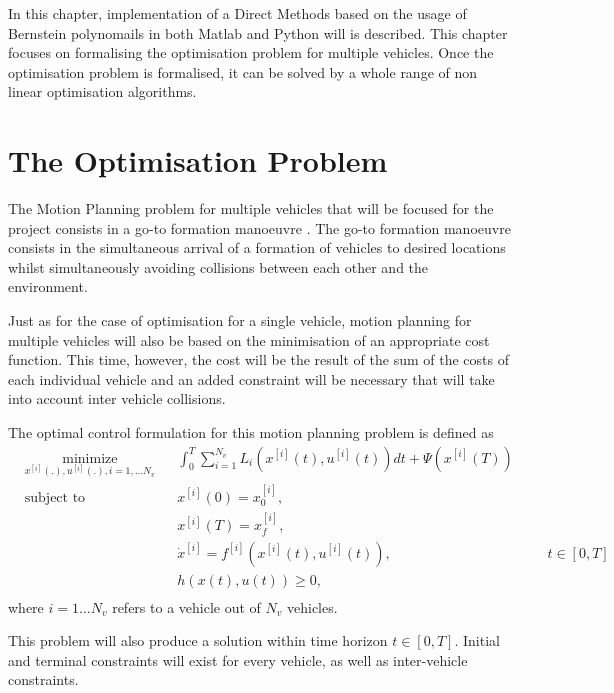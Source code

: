 \cleardoublepage
\label{chap:implementation}

\par In this chapter, implementation of a Direct Methods based on the usage of Bernstein polynomails in both Matlab and Python will is described. This chapter focuses on formalising the optimisation problem for multiple vehicles. Once the optimisation problem is formalised, it can be solved by a whole range of non linear optimisation algorithms.

\section{The Optimisation Problem}
\label{sec:theoptproblem}

\par The Motion Planning problem for multiple vehicles that will be focused for the project consists in a go-to formation manoeuvre \cite{sabetghadam2018cooperative}. The go-to formation manoeuvre consists in the simultaneous arrival of a formation of vehicles to desired locations whilst simultaneously avoiding collisions between each other and the environment.

\par Just as for the case of optimisation for a single vehicle, motion planning for multiple vehicles will also be based on the minimisation of an appropriate cost function. This time, however, the cost will be the result of the sum of the costs of each individual vehicle and an added constraint will be necessary that will take into account inter vehicle collisions. 

\par The optimal control formulation for this motion planning problem is defined as
\begin{equation}
    \label{eq:multi_cost}
    \begin{aligned}
    & \underset{x^{[i]}(.),u^{[i]}(.),i= 1,\dots N_v}{\text{minimize}} && \int_0^T \sum_{i=1}^{N_v}  L_i (x^{[i]}(t),u^{[i]}(t))dt + \Psi (x^{[i]}(T)) \\
    & \text{subject to}  && x^{[i]}(0) = x_0^{[i]}, \\
        & && x^{[i]}(T) = x_f^{[i]}, \\
        & && \dot{x}^{[i]} = f^{[i]} (x^{[i]}(t), u^{[i]}(t)), &&& t \in [0,T]\\
        & && h(x(t),u(t)) \geq 0, \\
    \end{aligned}
\end{equation}
where $i=1\dots N_v$ refers to a vehicle out of $N_v$ vehicles.
\par This problem will also produce a solution within time horizon $t\in [0,T]$. Initial and terminal constraints will exist for every vehicle, as well as inter-vehicle constraints.

